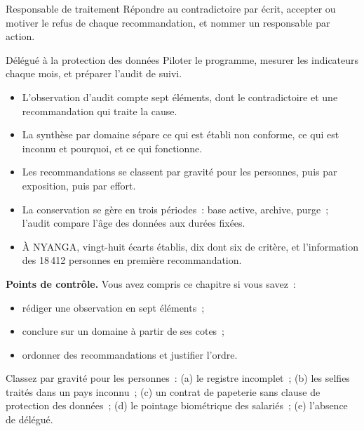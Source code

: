 \begin{boxmetier}{Responsable de traitement}
Répondre au contradictoire par écrit, accepter ou motiver le refus de
chaque recommandation, et nommer un responsable par action.
\end{boxmetier}

\begin{boxmetier}{Délégué à la protection des données}
Piloter le programme, mesurer les indicateurs chaque mois, et préparer
l'audit de suivi.
\end{boxmetier}

\begin{boxresume}
\begin{itemize}
    \item L'observation d'audit compte sept éléments, dont le
          contradictoire et une recommandation qui traite la cause.
    \item La synthèse par domaine sépare ce qui est établi non conforme, ce
          qui est inconnu et pourquoi, et ce qui fonctionne.
    \item Les recommandations se classent par gravité pour les personnes,
          puis par exposition, puis par effort.
    \item La conservation se gère en trois périodes~: base active, archive,
          purge~; l'audit compare l'âge des données aux durées fixées.
    \item À NYANGA, vingt-huit écarts établis, dix \NEK{} dont six de
          critère, et l'information des 18\,412 personnes en première
          recommandation.
\end{itemize}
\end{boxresume}

\begin{boxinfo}
\textbf{Points de contrôle.} Vous avez compris ce chapitre si vous savez~:
\begin{itemize}
    \item rédiger une observation en sept éléments~;
    \item conclure sur un domaine à partir de ses cotes~;
    \item ordonner des recommandations et justifier l'ordre.
\end{itemize}
\end{boxinfo}

\begin{boxexo}[title={\ding{45}\quad Exercice~13.1. Ordonner \niveaubase}]
Classez par gravité pour les personnes~: (a) le registre incomplet~; (b) les
selfies traités dans un pays inconnu~; (c) un contrat de papeterie sans
clause de protection des données~; (d) le pointage biométrique des
salariés~; (e) l'absence de délégué.
\end{boxexo}

